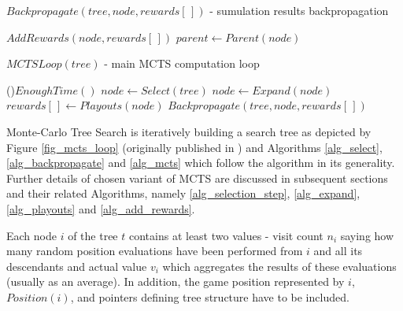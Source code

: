 \begin{algorithm}
\DontPrintSemicolon
\caption{$Backpropagate(tree, node, rewards[\,])$ - sumulation results backpropagation
\label{alg_backpropagate}}
$AddRewards(node, rewards[\,])$\;
$parent \leftarrow Parent(node)$\;
\end{algorithm}

\begin{algorithm}
\DontPrintSemicolon
\caption{$MCTSLoop(tree)$ - main MCTS computation loop\label{alg_mcts}}
\While(){$EnoughTime()$}{
    $node \leftarrow Select(tree)$ \;
    $node \leftarrow Expand(node)$ \;
    $rewards[\,] \leftarrow Playouts(node)$ \;
    $Backpropagate(tree,node,rewards[\,])$ \;
}
 \;
\end{algorithm}



Monte-Carlo Tree Search is iteratively building a search tree as depicted by Figure
\ref{fig_mcts_loop} (originally published in \cite{ChaslotPhd2010}) and Algorithms 
\ref{alg_select}, \ref{alg_backpropagate} and \ref{alg_mcts}
which follow the algorithm in its generality. Further details of chosen variant of MCTS
are discussed in subsequent sections and their related Algorithms, namely \ref{alg_selection_step},
\ref{alg_expand}, \ref{alg_playouts} and \ref{alg_add_rewards}.

Each node $i$ of the tree $t$ contains at least two values - visit count $n_i$
saying how many random position evaluations have been performed from $i$ and all its
descendants and
actual value $v_i$ which aggregates the results of these evaluations (usually as an average).
In addition, the game position represented by $i$, $Position(i)$, and pointers defining
tree structure have to be included. 


